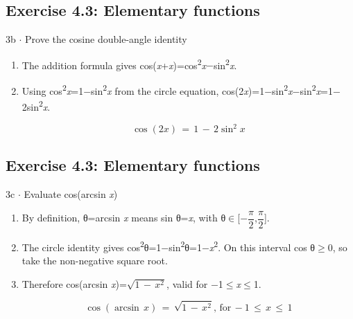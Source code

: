 \documentclass[11pt]{article}
\begin{document}
\begin{keepsection}\subsection{Exercise 4.3: Elementary functions}

\begin{workedbox}{3b \ensuremath{\cdot} Prove the cosine double-angle identity}
\begin{enumerate}
\item The addition formula gives cos(\textit{x}+\textit{x})=cos\textsuperscript{2}\textit{x}\ensuremath{-}sin\textsuperscript{2}\textit{x}.
\item {}
Using cos\textsuperscript{2}\textit{x}=1\ensuremath{-}sin\textsuperscript{2}\textit{x} from the circle equation, cos(2\textit{x})=1\ensuremath{-}sin\textsuperscript{2}\textit{x}\ensuremath{-}sin\textsuperscript{2}\textit{x}=1\ensuremath{-}2sin\textsuperscript{2}\textit{x}.

\begin{equation*}\cos (2{x})\, =\, 1\, -\, 2\sin ^{2}{x}\end{equation*}
\end{enumerate}
\end{workedbox}

\end{keepsection}
\begin{keepsection}\subsection{Exercise 4.3: Elementary functions}

\begin{workedbox}{3c \ensuremath{\cdot} Evaluate cos(arcsin \textit{x})}
\begin{enumerate}
\item By definition, θ=arcsin \textit{x} means sin θ=\textit{x}, with θ\ensuremath{\in}[\ensuremath{-}{\small\ensuremath{\dfrac{π}{2}}},{\small\ensuremath{\dfrac{π}{2}}}].
\item The circle identity gives cos\textsuperscript{2}θ=1\ensuremath{-}sin\textsuperscript{2}θ=1\ensuremath{-}\textit{x}\textsuperscript{2}. On this interval cos θ\ensuremath{\geq}0, so take the non-negative square root.
\item {}
Therefore cos(arcsin \textit{x})=\ensuremath{\sqrt{1\, -\, {x}^{2}}}, valid for \ensuremath{-}1\ensuremath{\leq}\textit{x}\ensuremath{\leq}1.

\begin{equation*}\cos (\arcsin \, {x})\, =\, \sqrt{1\, -\, {x}^{2}},\, \text{for}\, -1\, \leq \, {x}\, \leq \, 1\end{equation*}
\end{enumerate}
\end{workedbox}

\end{keepsection}
\end{document}
